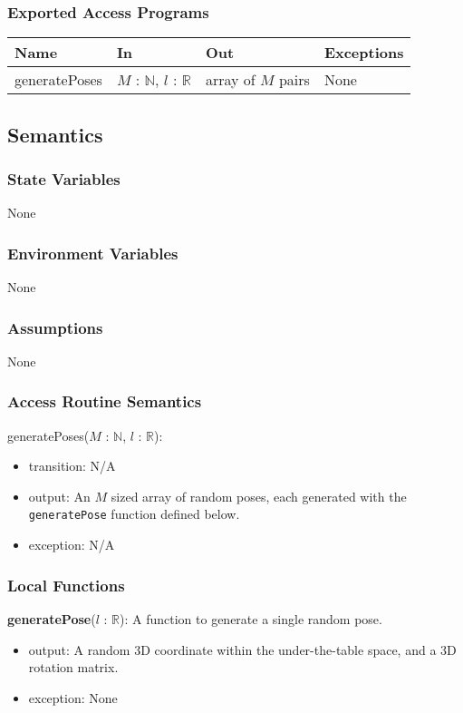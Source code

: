 \documentclass[12pt, titlepage]{article}
\begin{document}
\subsubsection{Exported Access Programs}
\begin{center}
\begin{tabular}{p{3cm} p{4cm} p{4cm} p{3cm}}
\hline
\textbf{Name} & \textbf{In} & \textbf{Out} & \textbf{Exceptions} \\
\hline
generatePoses & $M$ : $\mathbb{N}$, $l$ : $\mathbb{R}$ & array of $M$ pairs & None \\
\hline
\end{tabular}
\end{center}

\subsection{Semantics}

\subsubsection{State Variables}
None

\subsubsection{Environment Variables}
None

\subsubsection{Assumptions}
None 

\subsubsection{Access Routine Semantics}

\noindent generatePoses($M$ : $\mathbb{N}$, $l$ : $\mathbb{R}$):
\begin{itemize}
\item transition: N/A
\item output: An $M$ sized array of random poses, each generated with the \texttt{generatePose} function defined below.
\item exception: N/A
\end{itemize}

\subsubsection{Local Functions}
\textbf{generatePose}($l$ : $\mathbb{R}$): A function to generate a single random pose.
\begin{itemize}
  \item output: A random 3D coordinate within the under-the-table space, and a 3D rotation matrix.
  \item exception: None
\end{itemize}
\end{document}
